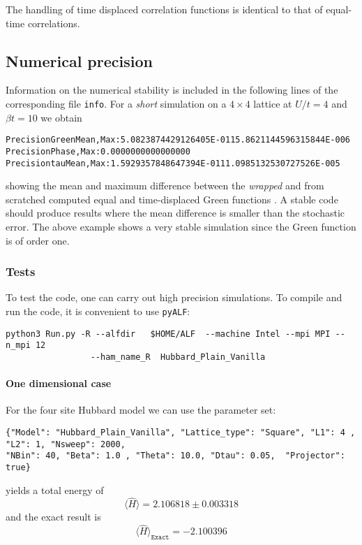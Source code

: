 The handling of time displaced correlation functions is identical to that of equal-time correlations. 

\subsection{Numerical precision}\label{sec:prec_spin}

Information on the numerical stability is included in the following lines of the corresponding file \texttt{info}. 
For a   \textit{short} simulation on a $4 \times 4$  lattice at $U/t=4$ and $\beta t = 10$  we obtain
 \begin{alltt}
Precision Green  Mean, Max :    5.0823874429126405E-011   5.8621144596315844E-006
Precision Phase, Max       :    0.0000000000000000     
Precision tau    Mean, Max :    1.5929357848647394E-011   1.0985132530727526E-005 
\end{alltt}
showing the mean and maximum difference between the \textit{wrapped}  and from scratched computed equal and time-displaced  Green functions \cite{Assaad08_rev}.
A stable code  should produce results where the mean difference is smaller than the  stochastic error. The above example  shows a very stable simulation since the Green function  is of order one. 

\subsubsection{Tests}

To test the code, one can carry out   high precision  simulations.  
To  compile and run the code, it is convenient to use \texttt{pyALF}: 
\begin{lstlisting}[style=fortran]
python3 Run.py -R --alfdir   $HOME/ALF  --machine Intel --mpi MPI --n_mpi 12   
                 --ham_name_R  Hubbard_Plain_Vanilla
\end{lstlisting}

\paragraph{One dimensional case} 

For the four site Hubbard model  we can use the parameter set:
 \begin{lstlisting}[style=fortran]
{"Model": "Hubbard_Plain_Vanilla", "Lattice_type": "Square", "L1": 4 , "L2": 1, "Nsweep": 2000,  
"NBin": 40, "Beta": 1.0 , "Theta": 10.0, "Dtau": 0.05,  "Projector": true}
\end{lstlisting}
yields a total energy of 
\begin{equation*}
       \langle  \hat{H}   \rangle = 2.106818     \pm   0.003318
\end{equation*}
and the exact result is  
\begin{equation*}
\langle  \hat{H}   \rangle_{\texttt{Exact}}    = -2.100396
\end{equation*}

